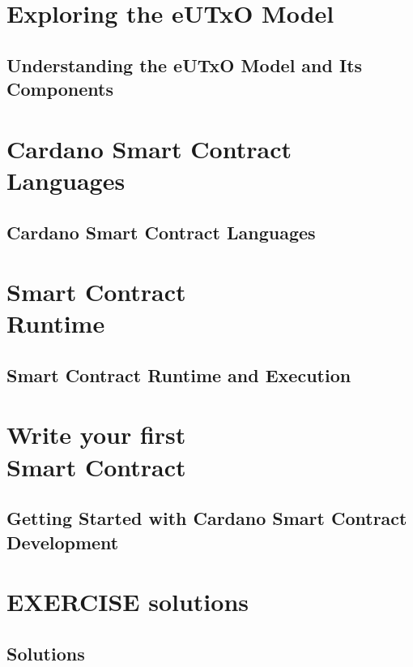 \part{Exploring the eUTxO Model}
\newpage
\chapter{Understanding the eUTxO Model and Its Components} \label{ch:exploring}



\part{Cardano Smart Contract Languages}
\newpage
\chapter{Cardano Smart Contract Languages} \label{ch:Languages}


\part{Smart Contract\\ Runtime}
\newpage
\chapter{Smart Contract Runtime and Execution} \label{ch:Runtime}


\part{Write your first\\ Smart Contract}
\newpage
\chapter{Getting Started with Cardano Smart Contract Development} \label{ch:Getting started}




\newpage
\part{EXERCISE solutions}
\chapter{Solutions}




\printglossary[title={Glossary}, type=main]



